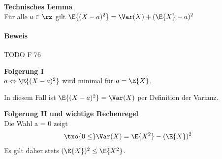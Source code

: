 \begin{lem}
    \textbf{Technisches Lemma}   \\
    Für alle $a \in \rz$ gilt $\E{(X - a)^2} = \Var(X) + (\E{X} - a)^2$

    \paragraph{Beweis} TODO F 76 %
\end{lem}

\begin{folg}
    \textbf{Folgerung I}   \\
    $a \Leftrightarrow \E{(X - a)^2}$ wird minimal für $a = \E{X}$.

    In diesem Fall ist $\E{(X - a)^2} = \Var(X)$ per Definition der Varianz.
\end{folg}

\begin{folg}
    \textbf{Folgerung II und wichtige Rechenregel}   \\
    Die Wahl a = 0 zeigt
    \[
        \txo{0 \leq } \Var(X) = \E{X^2} - (\E{X})^2
    \]
    Es gilt daher stets $(\E{X})^2 \le \E{X^2}$.
\end{folg}

